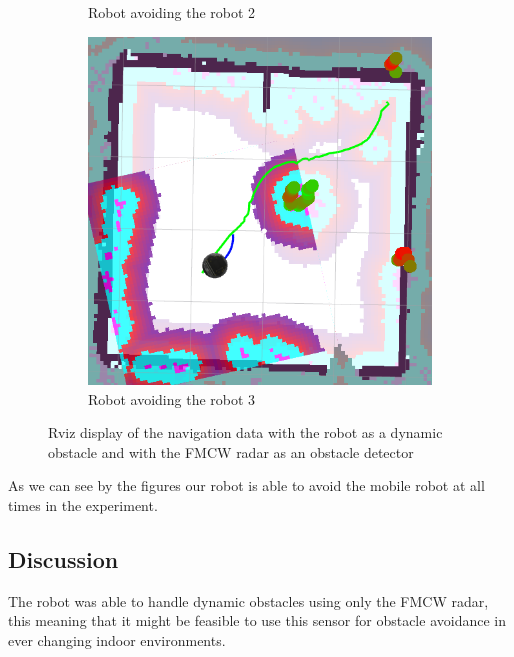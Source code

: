 \begin{figure}[ht!]
\begin{subfigure}[t]{0.3\linewidth}
    \caption{Robot avoiding the robot 2}
    \label{fig::person2}
  \end{subfigure}
   \begin{subfigure}[t]{0.3\linewidth}
    \includegraphics[width=\linewidth]{imgs/chapter5/robot3.png}
    \caption{Robot avoiding the robot 3}
    \label{fig::person3}
  \end{subfigure}
  \caption[Navigation data with the robot as a dynamic obstacle ]{Rviz display of the navigation data with the robot as a dynamic obstacle and with the \ac{FMCW} \ac{radar} as an obstacle detector}
  \label{fig:person}
\end{figure}
As we can see by the figures our robot is able to avoid the mobile robot at all times in the experiment.
\subsection{Discussion}
The robot was able to handle dynamic obstacles using only the \ac{FMCW} \ac{radar}, this meaning that it might be feasible to use this sensor for obstacle avoidance in ever changing indoor environments.

